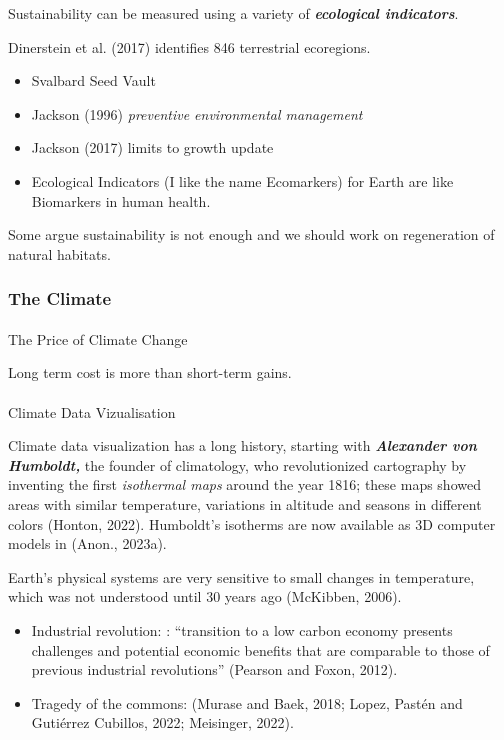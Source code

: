 \documentclass[
  letterpaper,
  DIV=11,
  numbers=noendperiod]{scrartcl}
\makeatletter
\let\oldparagraph\paragraph
\renewcommand{\paragraph}{
    \@ifstar
      \xxxParagraphStar
      \xxxParagraphNoStar
  }
\newcommand{\xxxParagraphStar}[1]{\oldparagraph*{#1}\mbox{}}
\newcommand{\xxxParagraphNoStar}[1]{\oldparagraph{#1}\mbox{}}
\providecommand{\tightlist}{%
  \setlength{\itemsep}{0pt}\setlength{\parskip}{0pt}}\usepackage{longtable,booktabs,array}
\makeatother
\begin{document}
Sustainability can be measured using a variety of
\textbf{\emph{ecological indicators}}.

Dinerstein et al. (2017) identifies 846 terrestrial ecoregions.

\begin{itemize}
\tightlist
\item
  Svalbard Seed Vault
\item
  Jackson (1996) \emph{preventive environmental management}
\item
  Jackson (2017) limits to growth update
\item
  Ecological Indicators (I like the name Ecomarkers) for Earth are like
  Biomarkers in human health.
\end{itemize}

Some argue sustainability is not enough and we should work on
regeneration of natural habitats.

\subsubsection{The Climate}\label{the-climate}

\paragraph{The Price of Climate
Change}\label{the-price-of-climate-change}

Long term cost is more than short-term gains.

\paragraph{Climate Data Vizualisation}\label{climate-data-vizualisation}

Climate data visualization has a long history, starting with
\textbf{\emph{Alexander von Humboldt,}} the founder of climatology, who
revolutionized cartography by inventing the first \emph{isothermal maps}
around the year 1816; these maps showed areas with similar temperature,
variations in altitude and seasons in different colors (Honton, 2022).
Humboldt's isotherms are now available as 3D computer models in (Anon.,
2023a).

Earth's physical systems are very sensitive to small changes in
temperature, which was not understood until 30 years ago (McKibben,
2006).

\begin{itemize}
\tightlist
\item
  Industrial revolution: : ``transition to a low carbon economy presents
  challenges and potential economic benefits that are comparable to
  those of previous industrial revolutions'' (Pearson and Foxon, 2012).
\item
  Tragedy of the commons: (Murase and Baek, 2018; Lopez, Pastén and
  Gutiérrez Cubillos, 2022; Meisinger, 2022).
\end{itemize}
\end{document}
